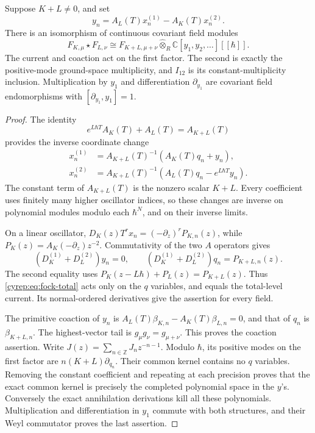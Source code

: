 \begin{theorem}\label{cyrep:thm:relative-fock}
Suppose \(K+L\ne0\), and set
\[
 y_n=A_L(T)x_n^{(1)}-A_K(T)x_n^{(2)}.
\]
There is an isomorphism of continuous covariant field modules
\begin{equation}\label{cyrep:eq:fock-relative-decomposition}
 F_{K,\mu}\star F_{L,\nu}
   \cong F_{K+L,\mu+\nu}\widehat\otimes_R
                          \mathbb C[y_1,y_2,\ldots][[\hbar]].
\end{equation}
The current and coaction act on the first factor. The second is
exactly the positive-mode ground-space multiplicity, and \(I_{12}\)
is its constant-multiplicity inclusion. Multiplication by \(y_1\)
and differentiation \(\partial_{y_1}\) are covariant field
endomorphisms with \([\partial_{y_1},y_1]=1\).
\end{theorem}

\begin{proof}
The identity
\[
 e^{L\hbar T}A_K(T)+A_L(T)=A_{K+L}(T)
\]
provides the inverse coordinate change
\[
 \begin{split}
 x_n^{(1)}&=A_{K+L}(T)^{-1}(A_K(T)q_n+y_n),\\
 x_n^{(2)}&=A_{K+L}(T)^{-1}
                       (A_L(T)q_n-e^{L\hbar T}y_n).
 \end{split}
\]
The constant term of \(A_{K+L}(T)\) is the nonzero scalar \(K+L\).
Every coefficient uses finitely many higher oscillator indices,
so these changes are inverse on polynomial modules modulo each
\(\hbar^N\), and on their inverse limits.

On a linear oscillator,
\(D_K(z)T^rx_n=(-\partial_z)^rP_{K,n}(z)\), while
\(P_K(z)=A_K(-\partial_z)z^{-2}\).
Commutativity of the two \(A\) operators gives
\[
 (D_K^{(1)}+D_L^{(2)})y_n=0,\qquad
 (D_K^{(1)}+D_L^{(2)})q_n=P_{K+L,n}(z).
\]
The second equality uses
\(P_K(z-L\hbar)+P_L(z)=P_{K+L}(z)\).
Thus \eqref{cyrep:eq:fock-total} acts only on the \(q\) variables,
and equals the total-level current. Its normal-ordered derivatives
give the assertion for every field.

The primitive coaction of \(y_n\) is
\(A_L(T)\beta_{K,n}-A_K(T)\beta_{L,n}=0\), and that of
\(q_n\) is \(\beta_{K+L,n}\). The highest-vector tail is
\(g_\mu g_\nu=g_{\mu+\nu}\). This proves the coaction assertion.
Write \(J(z)=\sum_{n\in\mathbb Z}J_nz^{-n-1}\).
Modulo \(\hbar\), its positive modes on the first factor are
\(n(K+L)\partial_{q_n}\). Their common kernel contains no \(q\)
variables. Removing the constant coefficient and repeating at
each precision proves that the exact common kernel is precisely
the completed polynomial space in the \(y\)'s. Conversely the
exact annihilation derivations kill all these polynomials.
Multiplication and differentiation in \(y_1\) commute with both
structures, and their Weyl commutator proves the last assertion.
\end{proof}

